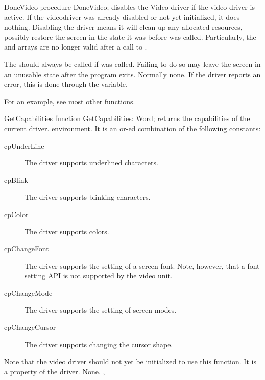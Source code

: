 \begin{procedure}{DoneVideo}
\Declaration
procedure DoneVideo; 
\Description
{} disables the Video driver if the video driver is active. If
the videodriver was already disabled or not yet initialized, it does
nothing. Disabling the driver means it will clean up any allocated
resources, possibly restore the screen in the state it was before
 was called. Particularly, the  and
 arrays are no longer valid after a call to 
.

The  should always be called if  was called.
Failing to do so may leave the screen in an unusable state after the program
exits.
\Errors
Normally none. If the driver reports an error, this is done through the
 variable.
\SeeAlso
{}
\end{procedure}

For an example, see most other functions.

\begin{function}{GetCapabilities}
\Declaration
function GetCapabilities: Word; 
\Description
{} returns the capabilities of the current driver.
environment. It is an or-ed combination of the following constants:
\begin{description}
\item[cpUnderLine] The driver supports underlined characters.
\item[cpBlink] The driver supports blinking characters.
\item[cpColor] The driver supports colors.
\item[cpChangeFont] The driver supports the setting of a screen font.
Note, however, that a font setting API is not supported by the video unit.
\item[cpChangeMode] The driver supports the setting of screen modes. 
\item[cpChangeCursor] The driver supports changing the cursor shape.
\end{description}
Note that the video driver should not yet be initialized to use this
function. It is a property of the driver.
\Errors
None.
\SeeAlso
{}, 
\end{function}


